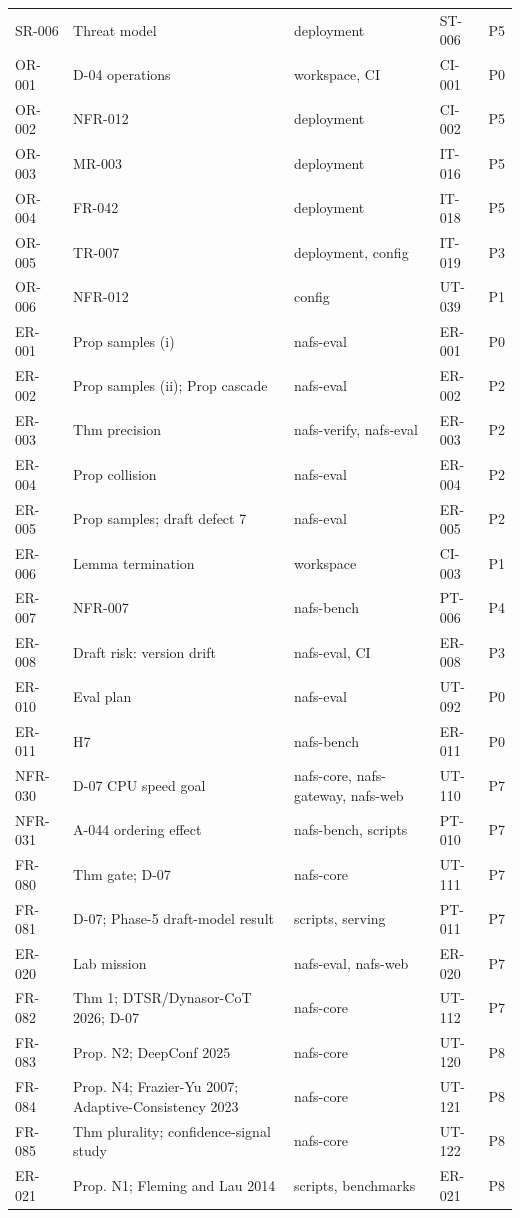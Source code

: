 \begin{longtable}{@{}p{1.45cm}p{4.4cm}p{4.2cm}p{3.1cm}p{1.1cm}@{}}
SR-006 & Threat model & deployment & ST-006 & P5\\
OR-001 & D-04 operations & workspace, CI & CI-001 & P0\\
OR-002 & NFR-012 & deployment & CI-002 & P5\\
OR-003 & MR-003 & deployment & IT-016 & P5\\
OR-004 & FR-042 & deployment & IT-018 & P5\\
OR-005 & TR-007 & deployment, config & IT-019 & P3\\
OR-006 & NFR-012 & config & UT-039 & P1\\
ER-001 & Prop samples (i) & nafs-eval & ER-001 & P0\\
ER-002 & Prop samples (ii); Prop cascade & nafs-eval & ER-002 & P2\\
ER-003 & Thm precision & nafs-verify, nafs-eval & ER-003 & P2\\
ER-004 & Prop collision & nafs-eval & ER-004 & P2\\
ER-005 & Prop samples; draft defect 7 & nafs-eval & ER-005 & P2\\
ER-006 & Lemma termination & workspace & CI-003 & P1\\
ER-007 & NFR-007 & nafs-bench & PT-006 & P4\\
ER-008 & Draft risk: version drift & nafs-eval, CI & ER-008 & P3\\
ER-010 & Eval plan & nafs-eval & UT-092 & P0\\
ER-011 & H7 & nafs-bench & ER-011 & P0\\
NFR-030 & D-07 CPU speed goal & nafs-core, nafs-gateway, nafs-web & UT-110 & P7\\
NFR-031 & A-044 ordering effect & nafs-bench, scripts & PT-010 & P7\\
FR-080 & Thm gate; D-07 & nafs-core & UT-111 & P7\\
FR-081 & D-07; Phase-5 draft-model result & scripts, serving & PT-011 & P7\\
ER-020 & Lab mission & nafs-eval, nafs-web & ER-020 & P7\\
FR-082 & Thm 1; DTSR/Dynasor-CoT 2026; D-07 & nafs-core & UT-112 & P7\\
FR-083 & Prop. N2; DeepConf 2025 & nafs-core & UT-120 & P8\\
FR-084 & Prop. N4; Frazier-Yu 2007; Adaptive-Consistency 2023 & nafs-core & UT-121 & P8\\
FR-085 & Thm plurality; confidence-signal study & nafs-core & UT-122 & P8\\
ER-021 & Prop. N1; Fleming and Lau 2014 & scripts, benchmarks & ER-021 & P8\\

\end{longtable}

